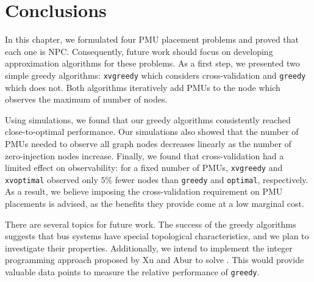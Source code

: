 \section{Conclusions}
\label{sec:pmu-conclude}

In this chapter, we formulated four PMU placement problems and proved that each one is NPC. 
Consequently, future work should focus on developing approximation algorithms for these problems.  As a first step, we presented two simple greedy algorithms:
{\tt xvgreedy} which considers cross-validation and {\tt greedy} which does not.  Both algorithms iteratively add PMUs to the node which observes the maximum of number of nodes. 

Using simulations, we found that our greedy algorithms consistently reached close-to-optimal performance.  Our simulations also
showed that the number of PMUs needed to observe all graph nodes decreases linearly as the number of zero-injection nodes increase. Finally, we found
that cross-validation had a limited effect on observability: for a fixed number of PMUs, {\tt xvgreedy} and {\tt xvoptimal} observed only $5\%$ fewer nodes than
{\tt greedy} and {\tt optimal}, respectively. As a result, we believe imposing the cross-validation requirement on PMU placements is advised, as the benefits they provide come at a low marginal cost.


There are several topics for future work. The success of the greedy algorithms suggests that bus systems have special topological characteristics, 
and we plan to investigate their properties.  
Additionally, we intend to implement the integer programming approach proposed by Xu and Abur \cite{Xu04} to solve \fulls.  This would
provide valuable data points to measure the relative performance of {\tt greedy}.

